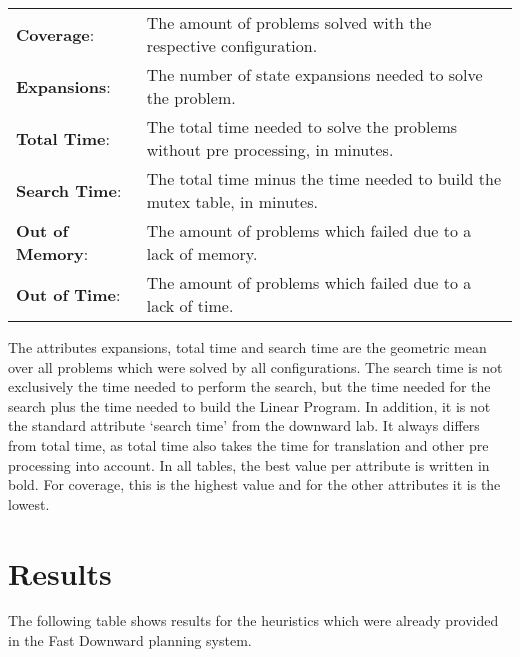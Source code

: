 \begin{center}
    \begin{tabularx}{\textwidth}{@{}lX@{}}
        \textbf{Coverage}: & The amount of problems solved with the respective configuration. \\
        \textbf{Expansions}: & The number of state expansions needed to solve the problem. \\
        \textbf{Total Time}: & The total time needed to solve the problems without pre processing, in minutes. \\
        \textbf{Search Time}: & The total time minus the time needed to build the mutex table, in minutes. \\
        \textbf{Out of Memory}: & The amount of problems which failed due to a lack of memory. \\
        \textbf{Out of Time}: & The amount of problems which failed due to a lack of time. \\
    \end{tabularx}
\end{center}

The attributes expansions, total time and search time are the geometric mean over all problems which were solved by all configurations.
The search time is not exclusively the time needed to perform the search, but the time needed for the search plus the time needed to build the Linear Program.
In addition, it is not the standard attribute `search time' from the downward lab.
It always differs from total time, as total time also takes the time for translation and other pre processing into account.
In all tables, the best value per attribute is written in bold.
For coverage, this is the highest value and for the other attributes it is the lowest.

\section{Results}\label{sec:results}
The following table shows results for the heuristics which were already provided in the Fast Downward planning system.

